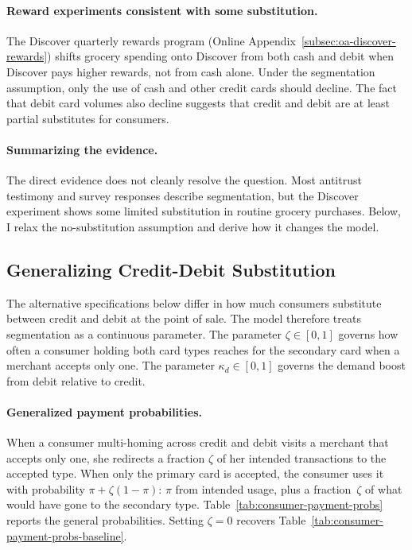 \documentclass[main.tex]{subfiles}
\begin{document}
\paragraph{Reward experiments consistent with some substitution.}
The Discover quarterly rewards program (Online Appendix~\ref{subsec:oa-discover-rewards}) shifts grocery spending onto Discover from both cash and debit when Discover pays higher rewards, not from cash alone.
Under the segmentation assumption, only the use of cash and other credit cards should decline.
The fact that debit card volumes also decline suggests that credit and debit are at least partial substitutes for consumers.

\paragraph{Summarizing the evidence.}
The direct evidence does not cleanly resolve the question.
Most antitrust testimony and survey responses describe segmentation, but the Discover experiment shows some limited substitution in routine grocery purchases.
Below, I relax the no-substitution assumption and derive how it changes the model.

\subsection{Generalizing Credit-Debit Substitution}
\label{subsubsec:oa-credit-debit-general}
\label{subsec:oa-credit-debit-segmentation}

The alternative specifications below differ in how much consumers substitute between credit and debit at the point of sale. 
The model therefore treats segmentation as a continuous parameter. 
The parameter $\zeta\in[0,1]$ governs how often a consumer holding both card types reaches for the secondary card when a merchant accepts only one. The parameter $\kappa_d\in[0,1]$ governs the demand boost from debit relative to credit.

\paragraph{Generalized payment probabilities.}
When a consumer multi-homing across credit and debit visits a merchant that accepts only one, she redirects a fraction $\zeta$ of her intended transactions to the accepted type.
When only the primary card is accepted, the consumer uses it with probability $\pi + \zeta(1-\pi)$: $\pi$ from intended usage, plus a fraction~$\zeta$ of what would have gone to the secondary type.
Table~\ref{tab:consumer-payment-probs} reports the general probabilities. Setting $\zeta = 0$ recovers Table~\ref{tab:consumer-payment-probs-baseline}.
\end{document}
